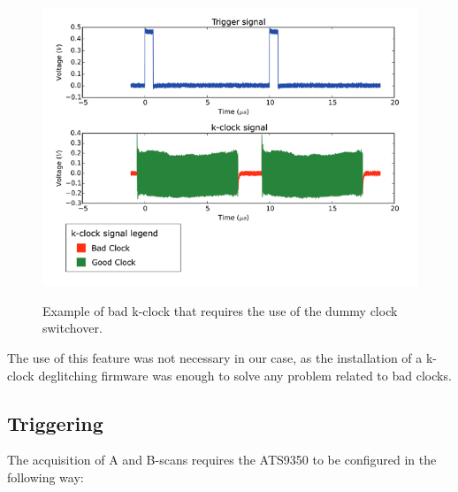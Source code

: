 	
    \begin{figure}[bth]
    	\myfloatalign
    	{\includegraphics[width=.95\linewidth]{gfx/ch3/dummy-clock}}
    	\caption{Example of bad k-clock that requires the use of the dummy clock switchover.}\label{fig:dummy-clock}
    \end{figure}
    
    The use of this feature was not necessary in our case, as the installation of a k-clock deglitching firmware was enough to solve any problem related to bad clocks. 
    
    \subsection{Triggering}
    The acquisition of A and B-scans requires the ATS9350 to be configured in the following way:
    
